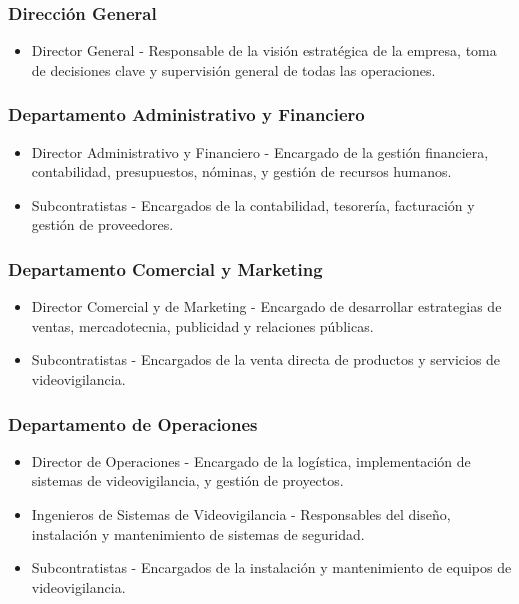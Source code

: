 \documentclass{report}
\begin{document}
            \subsubsection*{Dirección General}
              \begin{itemize}
              \item Director General - Responsable de la visión estratégica de la empresa, toma de decisiones clave y supervisión general de todas las operaciones.
              \end{itemize}
            \subsubsection*{Departamento Administrativo y Financiero}
              \begin{itemize}
              \item Director Administrativo y Financiero - Encargado de la gestión financiera, contabilidad, presupuestos, nóminas, y gestión de recursos humanos.
              \item Subcontratistas - Encargados de la contabilidad, tesorería, facturación y gestión de proveedores.
              \end{itemize}
            \subsubsection*{Departamento Comercial y Marketing}
              \begin{itemize}
              \item Director Comercial y de Marketing - Encargado de desarrollar estrategias de ventas, mercadotecnia, publicidad y relaciones públicas.
              \item Subcontratistas - Encargados de la venta directa de productos y servicios de videovigilancia.
              \end{itemize}
            \subsubsection*{Departamento de Operaciones}
              \begin{itemize}
              \item Director de Operaciones - Encargado de la logística, implementación de sistemas de videovigilancia, y gestión de proyectos.
              \item Ingenieros de Sistemas de Videovigilancia - Responsables del diseño, instalación y mantenimiento de sistemas de seguridad.
              \item Subcontratistas - Encargados de la instalación y mantenimiento de equipos de videovigilancia.
              \end{itemize}
\end{document}
